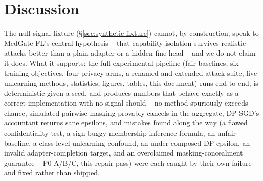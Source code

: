 \documentclass[11pt]{article}
\begin{document}
\section{Discussion}
\label{sec:discussion}
The null-signal fixture (\S\ref{sec:synthetic-fixture}) cannot, by
construction, speak to MedGate-FL's central hypothesis -- that capability
isolation survives realistic attacks better than a plain adapter or a hidden
fine head -- and we do not claim it does. What it supports: the full
experimental pipeline (fair baselines, six training objectives, four privacy
arms, a renamed and extended attack suite, five unlearning methods,
statistics, figures, tables, this document) runs end-to-end, is
deterministic given a seed, and produces numbers that behave exactly as a
correct implementation with no signal should -- no method spuriously
exceeds chance, simulated pairwise masking provably cancels in the
aggregate, DP-SGD's accountant returns sane epsilons, and mistakes found
along the way (a flawed confidentiality test, a sign-buggy membership-inference
formula, an unfair baseline, a class-level unlearning confound, an
under-composed DP epsilon, an invalid adapter-completion target, and an
overclaimed masking-concealment guarantee -- P0-A/B/C, this repair pass)
were each caught by their own failure and fixed rather than shipped.
\end{document}
